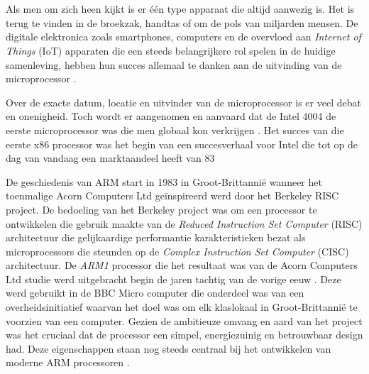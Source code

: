 
\chapter{}
\label{ch:inleiding}

Als men om zich heen kijkt is er één type apparaat die altijd aanwezig is. Het is terug te vinden in de broekzak, handtas of om de pols van miljarden mensen. De digitale elektronica zoals smartphones, computers en de overvloed aan \textit{Internet of Things} (IoT) apparaten die een steeds belangrijkere rol spelen in de huidige samenleving, hebben hun succes allemaal te danken aan de uitvinding van de microprocessor \autocite{Malone1998}. 

Over de exacte datum, locatie en uitvinder van de microprocessor is er veel debat en onenigheid. Toch wordt er aangenomen en aanvaard dat de Intel 4004 de eerste microprocessor was die men globaal kon verkrijgen \autocite{Aspray1997}. Het succes van die eerste x86 processor was het begin van een succesverhaal voor Intel die tot op de dag van vandaag een marktaandeel heeft van 83%

De geschiedenis van ARM start in 1983 in Groot-Brittannië wanneer het toenmalige Acorn Computers Ltd geïnspireerd werd door het Berkeley RISC project. De bedoeling van het Berkeley project was om een processor te ontwikkelen die gebruik maakte van de \textit{Reduced Instruction Set Computer} (RISC) architectuur die gelijkaardige performantie karakteristieken bezat als microprocessors die steunden op de \textit{Complex Instruction Set Computer} (CISC) architectuur. De \textit{ARM1} processor die het resultaat was van de Acorn Computers Ltd studie werd uitgebracht begin de jaren tachtig van de vorige eeuw \autocite{Ahammed2017}. Deze werd gebruikt in de BBC Micro computer die onderdeel was van een overheidsinitiatief waarvan het doel was om elk klaslokaal in Groot-Brittannië te voorzien van een computer. Gezien de ambitieuze omvang en aard van het project was het cruciaal dat de processor een simpel, energiezuinig en betrouwbaar design had. Deze eigenschappen staan nog steeds centraal bij het ontwikkelen van moderne ARM processoren \autocite{Walshe2015}.

